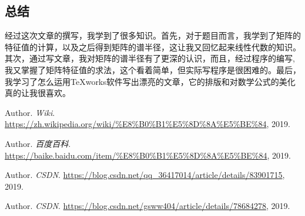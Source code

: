 \documentclass[cs4size,a4paper]{ctexart}
\numberwithin{equation}{section}
\numberwithin{table}{section}
\numberwithin{figure}{section}
\begin{document}
\subsection{总结}
经过这次文章的撰写，我学到了很多知识。首先，对于题目而言，我学到了矩阵的特征值的计算，以及之后得到矩阵的谱半径，这让我又回忆起来线性代数的知识。其次，通过写文章，我对矩阵的谱半径有了更深的认识，而且，经过程序的编写,我又掌握了矩阵特征值的求法，这个看着简单，但实际写程序是很困难的。最后，我学习了怎么运用TeXworks软件写出漂亮的文章，它的排版和对数学公式的美化真的让我很喜欢。



%
                         
\begin{thebibliography}{99}
Author. {\em \color{red}Wiki}. \url{https://zh.wikipedia.org/wiki/%E8%B0%B1%E5%8D%8A%E5%BE%84}, 2019.

Author. {\em \color{blue}百度百科}. \url{https://baike.baidu.com/item/%E8%B0%B1%E5%8D%8A%E5%BE%84}, 2019.

Author. {\em CSDN}. \url{https://blog.csdn.net/qq_36417014/article/details/83901715}, 2019.

Author. {\em CSDN}. \url{https://blog.csdn.net/gsww404/article/details/78684278}, 2019.
\end{thebibliography}
\end{document}
